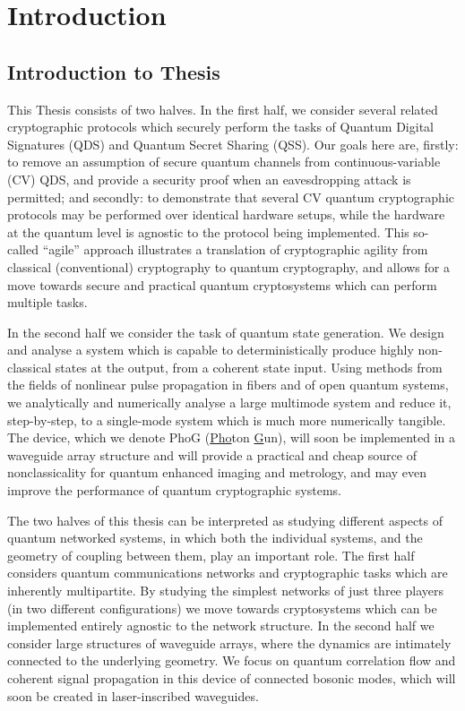 \chapter{Introduction}


\section{Introduction to Thesis}

This Thesis consists of two halves. In the first half, we consider several related cryptographic protocols which securely perform the tasks of Quantum Digital Signatures (QDS) and Quantum Secret Sharing (QSS). Our goals here are, firstly: to remove an assumption of secure quantum channels from continuous-variable (CV) QDS, and provide a security proof when an eavesdropping attack is permitted; and secondly: to demonstrate that several CV quantum cryptographic protocols may be performed over identical hardware setups, while the hardware at the quantum level is agnostic to the protocol being implemented. This so-called ``agile'' approach illustrates a translation of cryptographic agility from classical (conventional) cryptography to quantum cryptography, and allows for a move towards secure and practical quantum cryptosystems which can perform multiple tasks.

In the second half we consider the task of quantum state generation. We design and analyse a system which is capable to deterministically produce highly non-classical states at the output, from a coherent state input. Using methods from the fields of nonlinear pulse propagation in fibers and of open quantum systems, we analytically and numerically analyse a large multimode system and reduce it, step-by-step, to a single-mode system which is much more numerically tangible. The device, which we denote PhoG (\underline{Pho}ton \underline{G}un), will soon be implemented in a waveguide array structure and will provide a practical and cheap source of nonclassicality for quantum enhanced imaging and metrology, and may even improve the performance of quantum cryptographic systems. 

The two halves of this thesis can be interpreted as studying different aspects of quantum networked systems, in which both the individual systems, and the geometry of coupling between them, play an important role. The first half considers quantum communications networks and cryptographic tasks which are inherently multipartite. By studying the simplest networks of just three players (in two different configurations) we move towards cryptosystems which can be implemented entirely agnostic to the network structure. In the second half we consider large structures of waveguide arrays, where the dynamics are intimately connected to the underlying geometry. We focus on quantum correlation flow and coherent signal propagation in this device of connected bosonic modes, which will soon be created in laser-inscribed waveguides.

